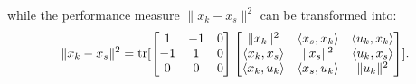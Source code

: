 while the performance measure $\|x_k - x_s\|^2$ can be transformed into:
\begin{equation}
	\|x_k - x_s\|^2 = \operatorname{\mathrm{tr}}[\begin{bmatrix}1 &-1 &0\\-1 & 1 & 0\\0 & 0 & 0\end{bmatrix}\begin{bmatrix}\|x_k\|^2 & \langle x_s, x_k \rangle & \langle u_k, x_k \rangle \\ \langle x_k, x_s \rangle & \|x_s\|^2 & \langle u_k, x_s \rangle \\ \langle x_k, u_k \rangle & \langle x_s, u_k \rangle & \|u_k\|^2\end{bmatrix}].
\end{equation}
